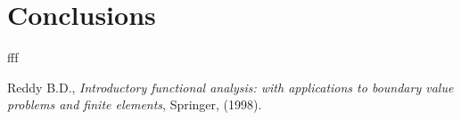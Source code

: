 \documentclass{marine_2015}
\begin{document}
\section{Conclusions}
\label{sec:end}
fff

\newpage
\begin{thebibliography}{99}

 Reddy B.D., \textit{Introductory functional analysis: with applications
  to boundary value problems and finite elements}, Springer, (1998).

%
%
%
%
%

\end{thebibliography}
\end{document}
